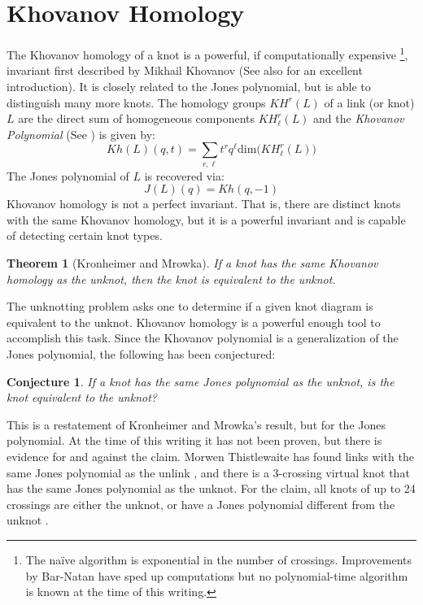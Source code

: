 \documentclass{article}
\theoremstyle{plain}
\newtheorem{theorem}{Theorem}
\newtheorem{conjecture}{Conjecture}
\begin{document}
	\section{Khovanov Homology}
	    The Khovanov homology of a knot is a powerful, if computationally
	    expensive%
	    \footnote{The na\"{i}ve algorithm is exponential in the number of
	    crossings. Improvements
	    by Bar-Natan \cite{Khovanov1999CatJonesPoly} have sped up computations
	    but no polynomial-time algorithm is known at the time of this writing.},
	    invariant first described by Mikhail Khovanov
	    \cite{Khovanov1999CatJonesPoly} (See also \cite{barnatan2002khovanov}
	    for an excellent introduction). It is closely related to the Jones
	    polynomial, but is able to distinguish many more knots. The homology
	    groups $KH^{r}(L)$ of a link (or knot) $L$ are the direct sum of
	    homogeneous components $KH_{\ell}^{r}(L)$ and the
	    \textit{Khovanov Polynomial} (See \cite{KatlasKhoHo}) is given by:
	    \begin{equation}
	        Kh(L)(q,t)=
	        \sum_{r,\ell}t^{r}q^{\ell}\textrm{dim}\big(KH_{\ell}^{r}(L)\big)
	    \end{equation}
	    The Jones polynomial of $L$ is recovered via:
	    \begin{equation}
	        J(L)(q)=Kh(q,-1)
	    \end{equation}
	    Khovanov homology is not a perfect invariant. That is, there are
	    distinct knots with the same Khovanov homology, but it is a powerful
	    invariant and is capable of detecting certain knot types.
	    \begin{theorem}[Kronheimer and Mrowka]
            If a knot has the same Khovanov homology as the unknot, then the
            knot is equivalent to the unknot.
	    \end{theorem}
	    The unknotting problem asks one to determine if a given knot diagram is
	    equivalent to the unknot. Khovanov homology is a powerful enough tool
	    to accomplish this task. Since the Khovanov polynomial is a
	    generalization of the Jones polynomial, the following has been
	    conjectured:
	    \begin{conjecture}
	        If a knot has the same Jones polynomial as the unknot, is the knot
	        equivalent to the unknot?
	    \end{conjecture}
	    This is a restatement of Kronheimer and Mrowka's result, but for the
	    Jones polynomial. At the time of this writing it has not been proven,
	    but there is evidence for and against the claim. Morwen Thistlewaite
	    has found links with the same Jones polynomial as the unlink
	    \cite{Thistlethwaite2001LINKSWT}, and there is a 3-crossing virtual
	    knot that has the same Jones polynomial as the unknot. For the claim,
	    all knots of up to 24 crossings are either the unknot, or have a
	    Jones polynomial different from the unknot
	    \cite{VerificationUnknotJonesConjUpTo24}.
\end{document}
